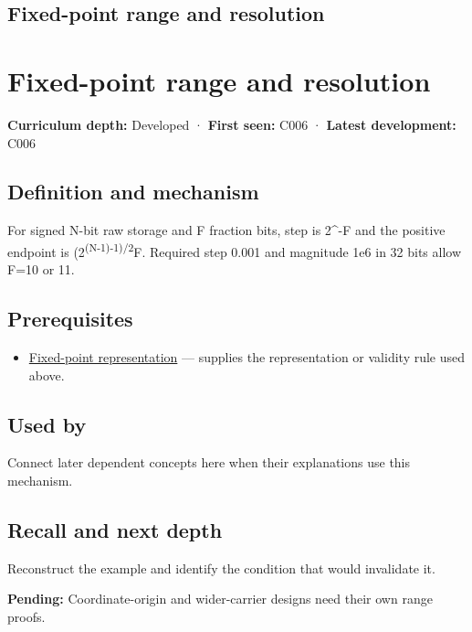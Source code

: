 \hypertarget{appendix-ceb4c4a9b5a1}{}
\section*{Fixed-point range and resolution}
\chapter{Fixed-point range and resolution}\label{appendix-ceb4c4a9b5a1-fixed-point-range-and-resolution}

\textbf{Curriculum depth:} Developed · \textbf{First seen:} C006 · \textbf{Latest development:} C006

\section{Definition and mechanism}\label{appendix-ceb4c4a9b5a1-definition-and-mechanism}

For signed N-bit raw storage and F fraction bits, step is 2\^{}-F and the positive endpoint is (2\textsuperscript{(N-1)-1)/2}F. Required step 0.001 and magnitude 1e6 in 32 bits allow F=10 or 11.

\section{Prerequisites}\label{appendix-ceb4c4a9b5a1-prerequisites}

\begin{itemize}
\tightlist
\item
  \hyperref[appendix-1d0dbe8924cc]{Fixed-point representation} --- supplies the representation or validity rule used above.
\end{itemize}

\section{Used by}\label{appendix-ceb4c4a9b5a1-used-by}

Connect later dependent concepts here when their explanations use this mechanism.

\section{Recall and next depth}\label{appendix-ceb4c4a9b5a1-recall-and-next-depth}

Reconstruct the example and identify the condition that would invalidate it.

\textbf{Pending:} Coordinate-origin and wider-carrier designs need their own range proofs.

